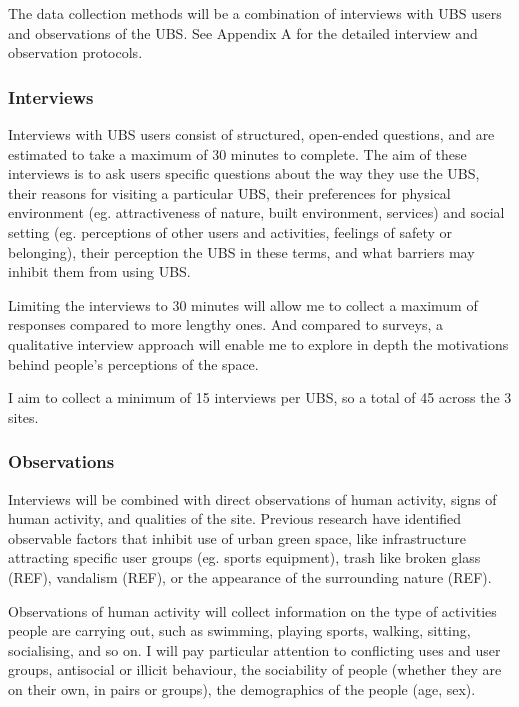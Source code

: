 \documentclass{article}
\begin{document}
The data collection methods will be a combination of interviews with UBS users and observations of the UBS. See Appendix A for the detailed interview and observation protocols.

\subsubsection{Interviews}

Interviews with UBS users consist of structured, open-ended questions, and are estimated to take a maximum of 30 minutes to complete. The aim of these interviews is to ask users specific questions about the way they use the UBS, their reasons for visiting a particular UBS, their preferences for physical environment (eg. attractiveness of nature, built environment, services) and  social setting (eg. perceptions of other users and activities, feelings of safety or belonging), their perception the UBS in these terms, and what barriers may inhibit them from using UBS.

Limiting the interviews to 30 minutes will allow me to collect a maximum of responses compared to more lengthy ones. And compared to surveys, a qualitative interview approach will enable me to explore in depth the motivations behind people's perceptions of the space.

I aim to collect a minimum of 15 interviews per UBS, so a total of 45 across the 3 sites.

\subsubsection{Observations}

Interviews will be combined with direct observations of human activity, signs of human activity, and qualities of the site. Previous research have identified observable factors that inhibit use of urban green space, like infrastructure attracting specific user groups (eg. sports equipment), trash like broken glass (REF), vandalism (REF), or the appearance of the surrounding nature (REF).

Observations of human activity will collect information on the type of activities people are carrying out, such as swimming, playing sports, walking, sitting, socialising, and so on. I will pay particular attention to conflicting uses and user groups, antisocial or illicit behaviour, the sociability of people (whether they are on their own, in pairs or groups), the demographics of the people (age, sex).
\end{document}
